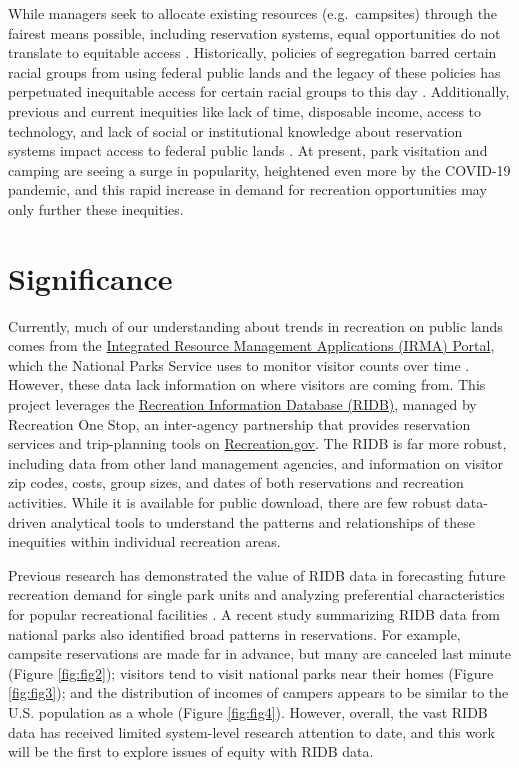 \documentclass[
]{book}
\begin{document}
While managers seek to allocate existing resources (e.g.~campsites) through the fairest means possible, including reservation systems, equal opportunities do not translate to equitable access \citep{Shelby1989}. Historically, policies of segregation barred certain racial groups from using federal public lands and the legacy of these policies has perpetuated inequitable access for certain racial groups to this day \citep{Xiao2021}. Additionally, previous and current inequities like lack of time, disposable income, access to technology, and lack of social or institutional knowledge about reservation systems impact access to federal public lands \citep{Scott2018}. At present, park visitation and camping are seeing a surge in popularity, heightened even more by the COVID-19 pandemic, and this rapid increase in demand for recreation opportunities may only further these inequities.

\hypertarget{significance}{%
\section{Significance}\label{significance}}

Currently, much of our understanding about trends in recreation on public lands comes from the \href{https://irma.nps.gov/Portal/}{Integrated Resource Management Applications (IRMA) Portal}, which the National Parks Service uses to monitor visitor counts over time \citep{Bergstrom2020}. However, these data lack information on where visitors are coming from. This project leverages the \href{https://ridb.recreation.gov/landing}{Recreation Information Database (RIDB)}, managed by Recreation One Stop, an inter-agency partnership that provides reservation services and trip-planning tools on \href{https://www.recreation.gov/}{Recreation.gov}. The RIDB is far more robust, including data from other land management agencies, and information on visitor zip codes, costs, group sizes, and dates of both reservations and recreation activities. While it is available for public download, there are few robust data-driven analytical tools to understand the patterns and relationships of these inequities within individual recreation areas.

Previous research has demonstrated the value of RIDB data in forecasting future recreation demand for single park units \citep{Rice2019} and analyzing preferential characteristics for popular recreational facilities \citep{Rice2021}. A recent study summarizing RIDB data from national parks \citep{Walls2018} also identified broad patterns in reservations. For example, campsite reservations are made far in advance, but many are canceled last minute (Figure \ref{fig:fig2}); visitors tend to visit national parks near their homes (Figure \ref{fig:fig3}); and the distribution of incomes of campers appears to be similar to the U.S. population as a whole (Figure \ref{fig:fig4}). However, overall, the vast RIDB data has received limited system-level research attention to date, and this work will be the first to explore issues of equity with RIDB data.
\end{document}
